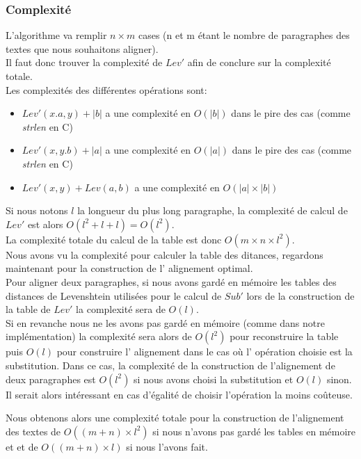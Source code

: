 \documentclass{article}
\begin{document}
\subsubsection{Complexité}

L'algorithme va remplir $n \times m$ cases (n et m étant le nombre de
paragraphes des textes que nous souhaitons aligner).\\
Il faut donc trouver la complexité de $Lev'$ afin de conclure sur la complexité
totale.\\
Les complexités des différentes opérations sont:
\begin{itemize}
	\item $Lev'(x.a,y) + \lvert b \rvert$ a une complexité en $O(\lvert b
		\rvert)$ dans le pire des cas (comme \textit{strlen} en C) 
	\item $Lev'(x,y.b) + \lvert a \rvert$ a une complexité en $O(\lvert a
		\rvert)$ dans le pire des cas (comme \textit{strlen} en C) 
	\item $Lev'(x,y) + Lev(a,b)$ a une complexité en $O( \lvert a \rvert \times
		\lvert b \rvert)$
\end{itemize}

Si nous notons $l$ la longueur du plus long paragraphe, la complexité de calcul
de $Lev'$ est alors $O(l^2+l+l) = O(l^2)$.\\
La complexité totale du calcul de la table est donc $O(m \times n \times l^2)$.\\

Nous avons vu la complexité pour calculer la table des ditances, regardons
maintenant pour la construction de l' alignement optimal.\\
Pour aligner deux paragraphes, si nous avons gardé en mémoire les tables des
distances de Levenshtein utilisées pour le calcul de $Sub'$ lors de la
construction de la table de $Lev'$ la complexité sera de $O(l)$.\\
Si en revanche nous ne les avons pas gardé en mémoire (comme dans notre
implémentation) la complexité sera alors de $O(l^2)$ pour reconstruire la table
puis $O(l)$ pour construire l' alignement dans le cas où l' opération choisie
est la substitution. Dans ce cas, la complexité de la construction de
l'alignement de deux paragraphes est $O(l^2)$ si nous avons choisi la
substitution et $O(l)$ sinon. Il serait alors intéressant en cas d'égalité de
choisir l'opération la moins coûteuse.

Nous obtenons alors une complexité totale pour la construction de l'alignement 
des textes de $O((m+n)\times l^2)$ si nous n'avons pas gardé les tables en
mémoire et et de $O((m+n)\times l)$ si nous l'avons fait.
\end{document}
